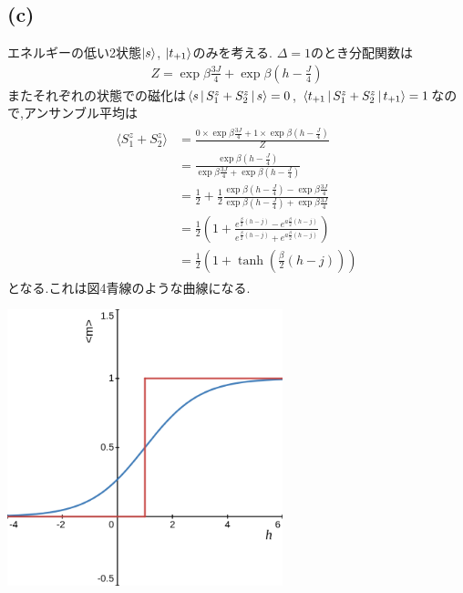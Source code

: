 \documentclass[uplatex,a4j,11pt,dvipdfmx]{jsarticle}
\makeatletter
\def\fgcaption{\def\@captype{figure}\caption}
\makeatother
\begin{document}
\subsection*{(c)}
エネルギーの低い2状態$\Ket{s}$, $\Ket{t_{+1}}$のみを考える.
$\Delta=1$のとき分配関数は
\begin{align}
  Z=\exp{\beta\frac{3J}{4}}+\exp{\beta\left(h-\frac{J}{4}\right)}
\end{align}
またそれぞれの状態での磁化は$\Braket{s|S_1^z+S_2^z|s}=0$, $\Braket{t_{+1}|S_1^z+S_2^z|t_{+1}}=1$なので,アンサンブル平均は
\begin{align}
  \begin{split}
    \langle S_1^z+S_2^z\rangle&=\frac{0\times\exp\beta\frac{3J}{4}+1\times\exp\beta\left(h-\frac{J}{4}\right)}{Z}\\
    &=\frac{\exp\beta\left(h-\frac{J}{4}\right)}{\exp{\beta\frac{3J}{4}}+\exp{\beta\left(h-\frac{J}{4}\right)}}\\
    &=\frac{1}{2}+\frac{1}{2}\frac{\exp{\beta\left(h-\frac{J}{4}\right)}-\exp{\beta\frac{3J}{4}}}{\exp{\beta\left(h-\frac{J}{4}\right)}+\exp{\beta\frac{3J}{4}}}\\
    &=\frac{1}{2}\left(1+\frac{e^{\frac{\beta}{2}\left(h-j\right)}-e^{a\frac{\beta}{2}\left(h-j\right)}}{e^{\frac{\beta}{2}\left(h-j\right)}+e^{a\frac{\beta}{2}\left(h-j\right)}}\right)\\
    &=\frac{1}{2}\left(1+\tanh\left(\frac{\beta}{2}(h-j)\right)\right)
  \end{split}
\end{align}
となる.これは図4青線のような曲線になる.
\begin{center}
  \includegraphics[width=8cm]{mmean.png}
  \fgcaption{青線:正準分布を用いて計算した磁化の期待値,赤線:図2で示した磁化の期待値, 共に$J=1$, $\beta=1$とした.}
\end{center}
\end{document}
